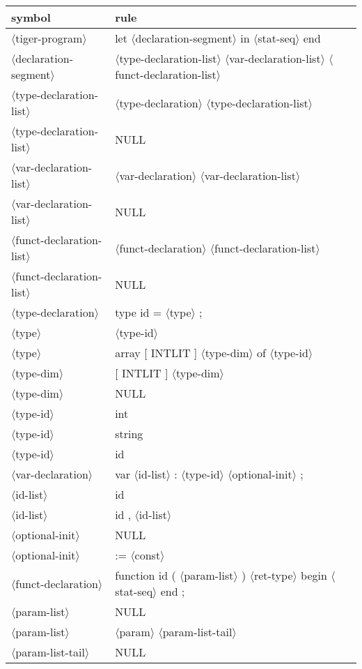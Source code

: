 \documentclass[11pt, fleqn]{article}
\newcommand{\atag}[1]{$\langle$#1$\rangle$}
\begin{document}
\begin{longtable}{l|l}
symbol							&	rule								\\
\hline
\atag{tiger-program}				&	let \atag{declaration-segment} in \atag{stat-seq} end				\\
\atag{declaration-segment}		&	\atag{type-declaration-list}	\atag{var-declaration-list} \atag{funct-declaration-list}	\\
\atag{type-declaration-list}		&	\atag{type-declaration} \atag{type-declaration-list}	\\
\atag{type-declaration-list}		&	NULL		\\
\atag{var-declaration-list}		&	\atag{var-declaration} \atag{var-declaration-list}	\\
\atag{var-declaration-list}		&	NULL		\\
\atag{funct-declaration-list}	&	\atag{funct-declaration} \atag{funct-declaration-list}	\\
\atag{funct-declaration-list}	&	NULL		\\
\atag{type-declaration}			&	type id = \atag{type} ;		\\
\atag{type}						&	\atag{type-id}		\\
\atag{type}						&	array [ INTLIT ] \atag{type-dim} of \atag{type-id}	\\
\atag{type-dim}					&	[ INTLIT ] \atag{type-dim}	\\
\atag{type-dim}					&	NULL		\\
\atag{type-id}					&	int		\\
\atag{type-id}					&	string		\\
\atag{type-id}					&	id		\\
\atag{var-declaration}			&	var \atag{id-list} : \atag{type-id} \atag{optional-init} ;		\\
\atag{id-list}					&	id		\\
\atag{id-list}					&	id , \atag{id-list}		\\
\atag{optional-init}				&	NULL		\\
\atag{optional-init}				&	:= \atag{const}		\\
\atag{funct-declaration}			&	function id ( \atag{param-list} ) \atag{ret-type} begin \atag{stat-seq} end ;	\\
\atag{param-list}				&	NULL		\\
\atag{param-list}				&	\atag{param}	 \atag{param-list-tail}	\\
\atag{param-list-tail}			&	NULL		\\

\end{longtable}
\end{document}
